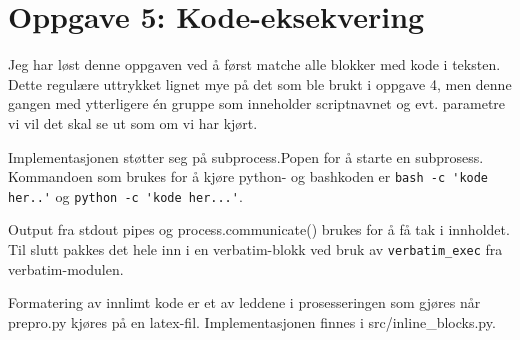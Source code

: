 \section*{Oppgave 5: Kode-eksekvering}

Jeg har løst denne oppgaven ved å først matche alle blokker med kode i teksten. Dette regulære uttrykket lignet mye på det som ble brukt i oppgave 4, men denne gangen med ytterligere én gruppe som inneholder scriptnavnet og evt. parametre vi vil det skal se ut som om vi har kjørt.

Implementasjonen støtter seg på subprocess.Popen for å starte en subprosess. Kommandoen som brukes for å kjøre python- og bashkoden er \verb;bash -c 'kode her..'; og \verb;python -c 'kode her...';.

Output fra stdout pipes og process.communicate() brukes for å få tak i innholdet. Til slutt pakkes det hele inn i en verbatim-blokk ved bruk av \verb;verbatim_exec; fra verbatim-modulen.

Formatering av innlimt kode er et av leddene i prosesseringen som gjøres når prepro.py kjøres på en latex-fil. Implementasjonen finnes i src/inline\_blocks.py.